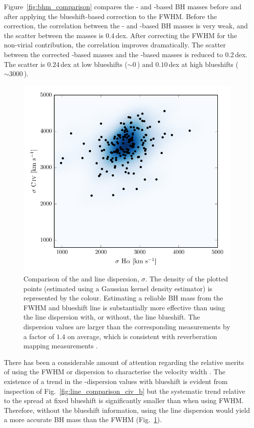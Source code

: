 Figure~\ref{fig:bhm_comparison} compares the - and \hans-based BH masses before and after applying the blueshift-based correction to the  FWHM.
Before the correction, the correlation between the - and \hans-based BH masses is very weak, and the scatter between the masses is $0.4$\,dex. 
After correcting the  FWHM for the non-virial contribution, the correlation improves dramatically. 
The scatter between the corrected -based masses and the \hans-based masses is reduced to 0.2\,dex. 
The scatter is $0.24$\,dex at low  blueshifts ($\sim0$\,\kms) and $0.10$\,dex at high blueshifts ($\sim3000$\,\kms). 

\begin{figure}
    \centering 
    \includegraphics[width=0.8\columnwidth]{figures/chapter03/dispersion_comparison.pdf} 
    \caption[{Comparison of the  and \ha line dispersion, $\sigma$.}]{Comparison of the  and \ha line dispersion, $\sigma$. The density of the plotted points (estimated using a Gaussian kernel density estimator) is represented by the colour. Estimating a reliable BH mass from the  FWHM and blueshift line is substantially more effective than using the  line dispersion with, or without, the line blueshift. The  dispersion values are larger than the corresponding \ha measurements by a factor of $1.4$ on average, which is consistent with reverberation mapping measurements \citep{vestergaard06}.} 
    \label{fig:dispersion_comparison}
\end{figure}

There has been a considerable amount of attention regarding the relative merits of using the FWHM or dispersion to characterise the velocity width \citep[e.g.][]{denney13}.
The existence of a trend in the -dispersion values with  blueshift is evident from inspection of Fig.~\ref{fig:line_comparison_civ_b} but the systematic trend relative to the spread at fixed blueshift is significantly smaller than when using  FWHM. 
Therefore, without the blueshift information, using the line dispersion would yield a more accurate BH mass than the FWHM (Fig.~\ref{fig:dispersion_comparison}). 

